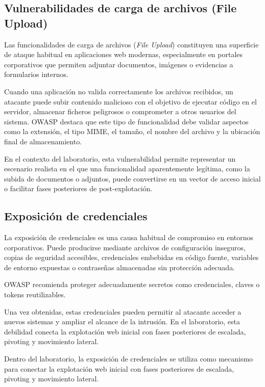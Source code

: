 \subsection{Vulnerabilidades de carga de archivos (File Upload)}

Las funcionalidades de carga de archivos (\textit{File Upload}) constituyen una superficie de ataque habitual en aplicaciones web modernas, especialmente en portales corporativos que permiten adjuntar documentos, imágenes o evidencias a formularios internos.

Cuando una aplicación no valida correctamente los archivos recibidos, un atacante puede subir contenido malicioso con el objetivo de ejecutar código en el servidor, almacenar ficheros peligrosos o comprometer a otros usuarios del sistema. OWASP destaca que este tipo de funcionalidad debe validar aspectos como la extensión, el tipo MIME, el tamaño, el nombre del archivo y la ubicación final de almacenamiento.

En el contexto del laboratorio, esta vulnerabilidad permite representar un escenario realista en el que una funcionalidad aparentemente legítima, como la subida de documentos o adjuntos, puede convertirse en un vector de acceso inicial o facilitar fases posteriores de post-explotación.


\subsection{Exposición de credenciales}

La exposición de credenciales es una causa habitual de compromiso en entornos corporativos. Puede producirse mediante archivos de configuración inseguros, copias de seguridad accesibles, credenciales embebidas en código fuente, variables de entorno expuestas o contraseñas almacenadas sin protección adecuada.

OWASP recomienda proteger adecuadamente secretos como credenciales, claves o tokens reutilizables.

Una vez obtenidas, estas credenciales pueden permitir al atacante acceder a nuevos sistemas y ampliar el alcance de la intrusión. En el laboratorio, esta debilidad conecta la explotación web inicial con fases posteriores de escalada, pivoting y movimiento lateral.

Dentro del laboratorio, la exposición de credenciales se utiliza como mecanismo para conectar la explotación web inicial con fases posteriores de escalada, pivoting y movimiento lateral.


